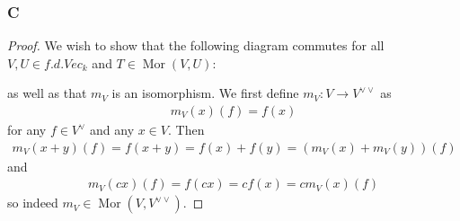 \documentclass{article}
\DeclareMathOperator{\Mor}{\mathrm{Mor}}
\begin{document}
\subsubsection{C}\label{1.2.C}
\begin{proof}
    We wish to show that the following diagram commutes for all $V,U\in f.d.Vec_k$ and $T\in \Mor(V,U)$:
    \begin{center}
    \end{center}
    as well as that $m_V$ is an isomorphism. We first define $m_V:V\to V^{\lor \lor}$ as
    \begin{align*}
        m_V(x)(f)=f(x)
    \end{align*}
    for any $f\in V^\lor$ and any $x\in V$. Then 
    \begin{align*}
        m_V(x+y)(f)=f(x+y)=f(x)+f(y)=(m_V(x)+m_V(y))(f)
    \end{align*}
    and
    \begin{align*}
        m_V(cx)(f)=f(cx)=cf(x)=cm_V(x)(f)
    \end{align*}
    so indeed $m_V\in \Mor(V,V^{\lor \lor})$. 


\end{proof}
\end{document}
